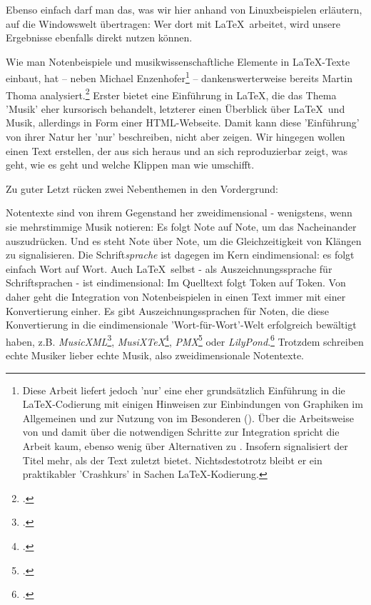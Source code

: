 Ebenso einfach darf man das, was wir hier anhand von Linuxbeispielen erläutern,
auf die Windowswelt übertragen: Wer dort mit \LaTeX\ arbeitet, wird unsere
Ergebnisse ebenfalls direkt nutzen können.

Wie man Notenbeispiele und musikwissenschaftliche Elemente in \LaTeX-Texte
einbaut, hat -- neben Michael Enzenhofer\footnote{Diese Arbeit liefert jedoch
'nur' eine eher grundsätzlich Einführung in die \LaTeX-Co\-die\-rung mit einigen
Hinweisen zur Einbindungen von Graphiken im Allgemeinen und zur Nutzung von
 im Besonderen (\cite[vgl. dazu][4ff, 31ff u.
21ff]{Enzenhofer2016a}). Über die Arbeitsweise von  und damit über
die notwendigen Schritte zur Integration spricht die Arbeit kaum, ebenso wenig
über Alternativen zu . Insofern signalisiert der Titel mehr, als
der Text zuletzt bietet. Nichtsdestotrotz bleibt er ein praktikabler 'Crashkurs'
in Sachen \LaTeX-Kodierung.} -- dankenswerterweise bereits Martin Thoma
analysiert.\footcite[vgl.][\nopage wp]{Thoma2018a} Erster bietet eine Einführung
in \LaTeX, die das Thema 'Musik' eher kursorisch behandelt, letzterer einen
Überblick über \LaTeX\ und Musik, allerdings in Form einer HTML-Webseite.
Damit kann diese 'Einführung' von ihrer Natur her 'nur' beschreiben, nicht aber
zeigen. Wir hingegen wollen einen Text erstellen, der aus sich heraus und an
sich reproduzierbar zeigt, was geht, wie es geht und welche Klippen man wie
umschifft.

Zu guter Letzt rücken zwei Nebenthemen in den Vordergrund:

Notentexte sind von ihrem Gegenstand her zweidimensional - wenigstens, wenn sie
mehrstimmige Musik notieren: Es folgt Note auf Note, um das Nacheinander
auszudrücken. Und es steht Note über Note, um die Gleichzeitigkeit von Klängen
zu signalisieren. Die Schrift\textit{sprache} ist dagegen im Kern eindimensional:
es folgt einfach Wort auf Wort. Auch \LaTeX\ selbst - als Auszeichnungssprache
für Schriftsprachen - ist eindimensional: Im Quelltext folgt Token auf Token.
Von daher geht die Integration von Notenbeispielen in einen Text immer mit einer
Konvertierung einher. Es gibt Auszeichnungssprachen für Noten, die diese
Konvertierung in die eindimensionale 'Wort-für-Wort'-Welt erfolgreich bewältigt
haben, z.B. \textit{MusicXML}\footcite[vgl.][\nopage wp]{MusicXML2018a},
\textit{MusiX\TeX}\footcite[vgl.][\nopage wp]{CtanMusixTex2018a},
\textit{PMX}\footcite[vgl.][\nopage wp]{CtanPmx2018a} oder
\textit{LilyPond}.\footcite[vgl.][\nopage wp]{LilyPond2018a} Trotzdem schreiben
echte Musiker lieber echte Musik, also zweidimensionale Notentexte. 

